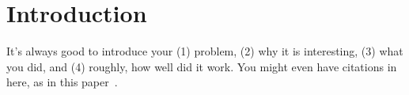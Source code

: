 \chapter{Introduction}
\label{chap:intro}

It's always good to introduce your (1) problem, (2) why it is interesting, (3) what you did, and (4) roughly, 
how well did it work. You might even have citations in here, as in this paper~\cite{Asawa:2008:TDT}.



